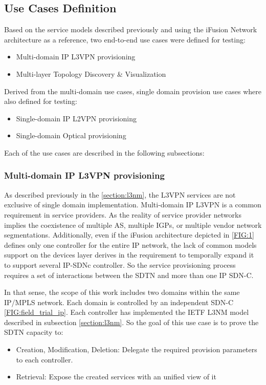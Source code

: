 \documentclass[a4paper,fleqn]{cas-dc}
\begin{document}
\subsection{Use Cases Definition}
Based on the service models described previously and using the iFusion Network architecture as a reference, two end-to-end use cases were defined for testing: 
\begin{itemize}
    \item Multi-domain IP L3VPN provisioning
    \item Multi-layer Topology Discovery \& Visualization
\end{itemize}
Derived from the multi-domain use cases, single domain provision use cases where also defined for testing:
\begin{itemize}
    \item Single-domain IP L2VPN provisioning
    \item Single-domain Optical provisioning
\end{itemize}
Each of the use cases are described in the following subsections:

\subsubsection{Multi-domain IP L3VPN provisioning}
\label{section:muli-l3nm}

As described previously in the \cref{section:l3nm}, the L3VPN services are not exclusive of single domain implementation. Multi-domain IP L3VPN is a common requirement in service providers. As the reality of service provider networks implies the coexistence of multiple AS, multiple IGPs, or multiple vendor network segmentations. Additionally, even if the iFusion architecture depicted in \ref{FIG:1} defines only one controller for the entire IP network, the lack of common models support on the devices layer derives in the requirement to temporally expand it to support several IP-SDNc controller. So the service provisioning process requires a set of interactions between the SDTN and more than one IP SDN-C.

In that sense, the scope of this work includes two domains within the same IP/MPLS network. Each domain is controlled by an independent SDN-C \ref{FIG:field_trial_ip}. Each controller has implemented the IETF L3NM model described in subsection \cref{section:l3nm}. So the goal of this use case is to prove the SDTN capacity to:
\begin{itemize}
    \item Creation, Modification, Deletion: Delegate the required provision parameters to each controller.
    \item Retrieval: Expose the created services with an unified view of it
\end{itemize}
\end{document}
